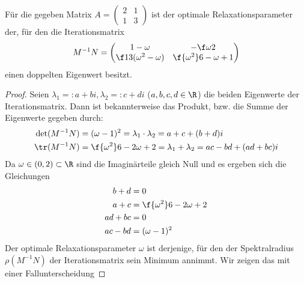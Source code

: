 \documentclass{scrartcl}
\begin{document}
\begin{aufgabe}
		\begin{lem*}
			Für die gegeben Matrix $A=\left(\begin{smallmatrix}2&1\\1&3\end{smallmatrix}\right)$ ist der optimale Relaxationsparameter der, für den die Iterationsmatrix
			\[
				M^{-1}N = \begin{pmatrix}1-\omega & -\f\omega2\\\f13(\omega^2-\omega)&\f{\omega^2}6-\omega +1\end{pmatrix}
			\]
			einen doppelten Eigenwert besitzt.
			\begin{proof}
				Seien $\lambda_1 =: a+bi, \lambda_2 =: c+di$ ($a,b,c,d\in\R$) die beiden Eigenwerte der Iterationsmatrix.
				Dann ist bekannterweise das Produkt, bzw. die Summe der Eigenwerte gegeben durch:
				\begin{align*}
					\det(M^{-1}N) &= (\omega-1)^2 = \lambda_1\cdot \lambda_2 = a+c+(b+d)i\\
					 \tr(M^{-1}N) &= \f{\omega^2}6 - 2\omega +2 = \lambda_1 + \lambda_2=ac-bd +(ad+bc)i
				\end{align*}
				Da $\omega\in(0,2)\subset \R$ sind die Imaginärteile gleich Null und es ergeben sich die Gleichungen
				\begin{align*}
					b + d &= 0\\
					a + c &= \f{\omega^2}6-2\omega+2\\
					ad+bc &= 0\\
					ac-bd &= (\omega-1)^2
				\end{align*}
				Der optimale Relaxationsparameter $\omega$ ist derjenige, für den der Spektralradius $\rho(M^{-1}N)$ der Iterationsmatrix sein Minimum annimmt.
				Wir zeigen das mit einer Fallunterscheidung


\end{proof}
\end{lem*}
\end{aufgabe}
\end{document}
